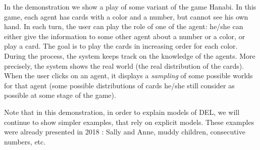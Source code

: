 
In the demonstration we show a play of some variant of the game Hanabi. 
In this game, each agent has cards with a color and a
number, but cannot see his own hand.
In each turn, the user can play the role of one of the agent: he/she can either give the information to some other agent about a number or a color, or play a card. The goal is to play the cards in increasing order for each color.
During the process, the system keeps track on the knowledge of the agents.
More precisely, the system shows the real world (the real distribution of the cards). When the user clicks on an agent, it displays a \emph{sampling} of some possible worlds for that agent (some possible distributions of cards he/she still consider as possible at some stage of the game).%
%
%
%



Note that in this demonstration, in order to explain models of DEL, we will continue to show simpler examples, that rely on explicit models. These examples were already presented in 2018 \cite{DBLP:conf/ijcai/Schwarzentruber18}: Sally and Anne, muddy children, consecutive numbers, etc.